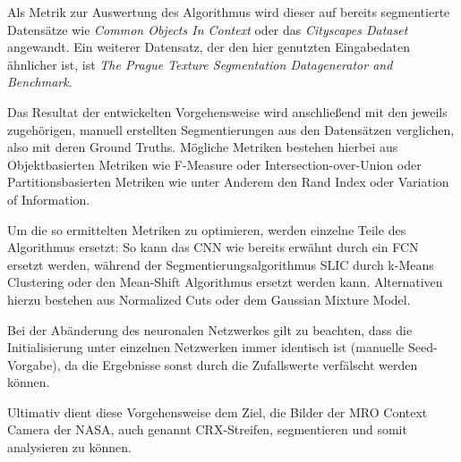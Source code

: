 \documentclass[a4paper,twocolumn,abstract,DIV=16]{scrartcl}
\begin{document}
Als Metrik zur Auswertung des Algorithmus wird dieser auf bereits segmentierte Datensätze wie \textit{Common Objects In Context}\cite{LMBHPRDZ:ECCV:2014} oder das \textit{Cityscapes Dataset}\cite{Cordts2016Cityscapes} angewandt. Ein weiterer Datensatz, der den hier genutzten Eingabedaten ähnlicher ist, ist \textit{The Prague Texture Segmentation Datagenerator and Benchmark}\cite{mikevs2015benchmarking}.

Das Resultat der entwickelten Vorgehensweise wird anschließend mit den jeweils zugehörigen, manuell erstellten Segmentierungen aus den Datensätzen verglichen, also mit deren Ground Truths. Mögliche Metriken bestehen hierbei aus Objektbasierten Metriken wie F-Measure oder Intersection-over-Union oder Partitionsbasierten Metriken wie unter Anderem den Rand Index\cite{randindex} oder Variation of Information\cite{meila2003comparing}.

Um die so ermittelten Metriken zu optimieren, werden einzelne Teile des Algorithmus ersetzt: So kann das CNN wie bereits erwähnt durch ein FCN ersetzt werden, während der Segmentierungsalgorithmus SLIC durch k-Means Clustering oder den Mean-Shift Algorithmus ersetzt werden kann.\cite{2019arXiv190603359A} Alternativen hierzu bestehen aus Normalized Cuts\cite{shi2000normalized} oder dem Gaussian Mixture Model\cite{8360143}.

Bei der Abänderung des neuronalen Netzwerkes gilt zu beachten, dass die Initialisierung unter einzelnen Netzwerken immer identisch ist (manuelle Seed-Vorgabe), da die Ergebnisse sonst durch die Zufallswerte verfälscht werden können.

Ultimativ dient diese Vorgehensweise dem Ziel, die Bilder der MRO Context Camera der NASA\cite{doi:10.1029/2006JE002808}, auch genannt CRX-Streifen, segmentieren und somit analysieren zu können.

\renewcommand\refname{Referenzen}

\end{document}
